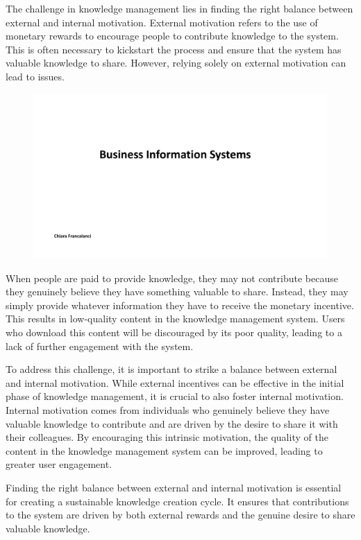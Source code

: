 The challenge in knowledge management lies in finding the right balance
between external and internal motivation. External motivation refers to
the use of monetary rewards to encourage people to contribute knowledge
to the system. This is often necessary to kickstart the process and
ensure that the system has valuable knowledge to share. However, relying
solely on external motivation can lead to issues.

\begin{figure}[!h]
  \centering
  \includegraphics[page=20, trim = 1.5cm 4.7cm 1.5cm 4cm, clip, width=\imagewidth]{images/05 - KM.pdf}
\end{figure}

When people are paid to provide knowledge, they may not contribute
because they genuinely believe they have something valuable to share.
Instead, they may simply provide whatever information they have to
receive the monetary incentive. This results in low-quality content in
the knowledge management system. Users who download this content will be
discouraged by its poor quality, leading to a lack of further engagement
with the system.

To address this challenge, it is important to strike a balance between
external and internal motivation. While external incentives can be
effective in the initial phase of knowledge management, it is crucial to
also foster internal motivation. Internal motivation comes from
individuals who genuinely believe they have valuable knowledge to
contribute and are driven by the desire to share it with their
colleagues. By encouraging this intrinsic motivation, the quality of the
content in the knowledge management system can be improved, leading to
greater user engagement.

Finding the right balance between external and internal motivation is
essential for creating a sustainable knowledge creation cycle. It
ensures that contributions to the system are driven by both external
rewards and the genuine desire to share valuable knowledge.

